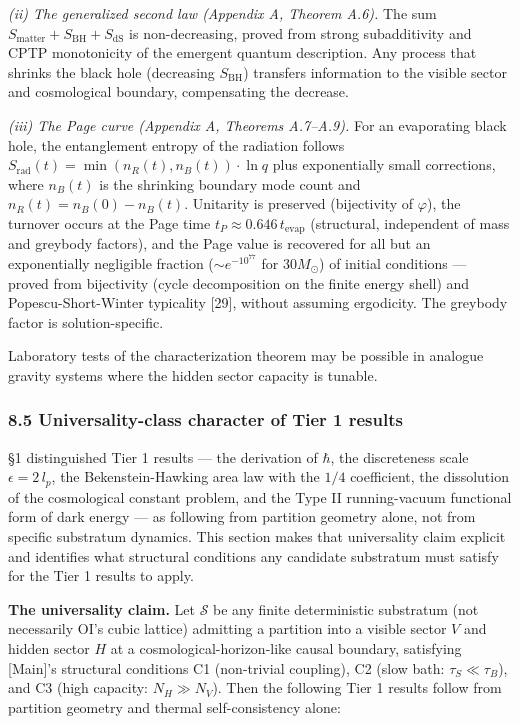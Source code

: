 \documentclass[
]{article}
\begin{document}
\emph{(ii) The generalized second law (Appendix A, Theorem A.6).} The
sum \(S_{\text{matter}} + S_{\text{BH}} + S_{\text{dS}}\) is
non-decreasing, proved from strong subadditivity and CPTP monotonicity
of the emergent quantum description. Any process that shrinks the black
hole (decreasing \(S_{\text{BH}}\)) transfers information to the visible
sector and cosmological boundary, compensating the decrease.

\emph{(iii) The Page curve (Appendix A, Theorems A.7--A.9).} For an
evaporating black hole, the entanglement entropy of the radiation
follows \(S_{\text{rad}}(t) = \min(n_R(t), n_B(t)) \cdot \ln q\) plus
exponentially small corrections, where \(n_B(t)\) is the shrinking
boundary mode count and \(n_R(t) = n_B(0) - n_B(t)\). Unitarity is
preserved (bijectivity of \(\varphi\)), the turnover occurs at the Page
time \(t_P \approx 0.646 \, t_{\text{evap}}\) (structural, independent
of mass and greybody factors), and the Page value is recovered for all
but an exponentially negligible fraction (\(\sim e^{-10^{77}}\) for
\(30 M_\odot\)) of initial conditions --- proved from bijectivity (cycle
decomposition on the finite energy shell) and Popescu-Short-Winter
typicality {[}29{]}, without assuming ergodicity. The greybody factor is
solution-specific.

Laboratory tests of the characterization theorem may be possible in
analogue gravity systems where the hidden sector capacity is tunable.

\hypertarget{universality-class-character-of-tier-1-results}{%
\subsubsection{8.5 Universality-class character of Tier 1
results}\label{universality-class-character-of-tier-1-results}}

§1 distinguished Tier 1 results --- the derivation of \(\hbar\), the
discreteness scale \(\epsilon = 2\,l_p\), the Bekenstein-Hawking area
law with the \(1/4\) coefficient, the dissolution of the cosmological
constant problem, and the Type II running-vacuum functional form of dark
energy --- as following from partition geometry alone, not from specific
substratum dynamics. This section makes that universality claim explicit
and identifies what structural conditions any candidate substratum must
satisfy for the Tier 1 results to apply.

\textbf{The universality claim.} Let \(\mathcal{S}\) be any finite
deterministic substratum (not necessarily OI's cubic lattice) admitting
a partition into a visible sector \(V\) and hidden sector \(H\) at a
cosmological-horizon-like causal boundary, satisfying {[}Main{]}'s
structural conditions C1 (non-trivial coupling), C2 (slow bath:
\(\tau_S \ll \tau_B\)), and C3 (high capacity: \(N_H \gg N_V\)). Then
the following Tier 1 results follow from partition geometry and thermal
self-consistency alone:
\end{document}
